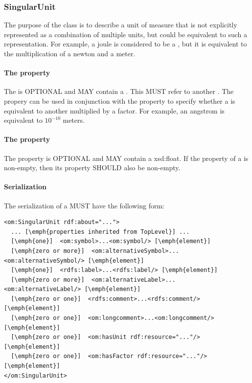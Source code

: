 \subsubsection{SingularUnit}
\label{sec:SingularUnit}

The purpose of the  class is to describe a unit of measure that is not explicitly represented as a combination of multiple units, but could be equivalent to such a representation. For example, a joule is considered to be a , but it is equivalent to the multiplication of a newton and a meter.  

\paragraph{The  property}\label{sec:hasUnit:SingularUnit}
The  is OPTIONAL and MAY contain a . This  MUST refer to another . The  propery can be used in conjunction with the  property to specify whether a  is equivalent to another  multiplied by a factor. For example, an angstrom is equivalent to $10^{-10}$ meters.

\paragraph{The  property}\label{sec:hasFactor:SingularUnit}
The  property is OPTIONAL and MAY contain a xsd:float. If the  property of a  is non-empty, then its  property SHOULD also be non-empty.

\paragraph{Serialization}
The serialization of a  MUST have the following form:


\begin{lstlisting}
<om:SingularUnit rdf:about="...">
  ... [\emph{properties inherited from TopLevel}] ...
  [\emph{one}]  <om:symbol>...<om:symbol/> [\emph{element}]
  [\emph{zero or more}]  <om:alternativeSymbol>...<om:alternativeSymbol/> [\emph{element}]
  [\emph{one}]  <rdfs:label>...<rdfs:label/> [\emph{element}]
  [\emph{zero or more}]  <om:alternativeLabel>...<om:alternativeLabel/> [\emph{element}]
  [\emph{zero or one}]  <rdfs:comment>...<rdfs:comment/> [\emph{element}]
  [\emph{zero or one}]  <om:longcomment>...<om:longcomment/> [\emph{element}]
  [\emph{zero or one}]  <om:hasUnit rdf:resource="..."/> [\emph{element}]
  [\emph{zero or one}]  <om:hasFactor rdf:resource="..."/> [\emph{element}]
</om:SingularUnit>
\end{lstlisting}


